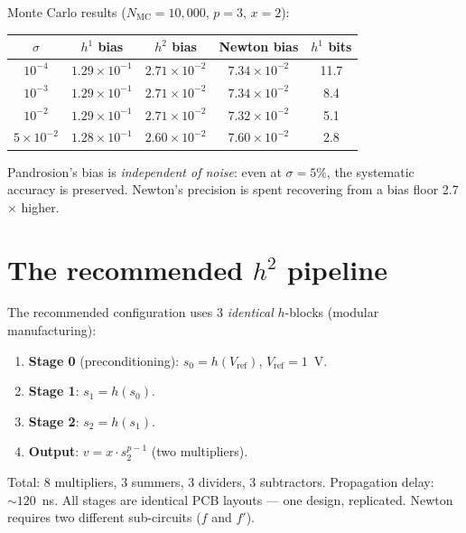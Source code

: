 \documentclass[10pt,a4paper,oneside]{book}
\theoremstyle{definition}
\theoremstyle{remark}
\begin{document}
Monte Carlo results ($N_{\mathrm{MC}} = 10{,}000$, $p = 3$, $x = 2$):

\begin{center}
\renewcommand{\arraystretch}{1.2}
\begin{tabular}{ccccc}
\toprule
$\sigma$ & $h^1$ bias & $h^2$ bias & Newton bias & $h^1$ bits \\
\midrule
$10^{-4}$ & $1.29 \times 10^{-1}$ & $2.71 \times 10^{-2}$ & $7.34 \times 10^{-2}$ & 11.7 \\
$10^{-3}$ & $1.29 \times 10^{-1}$ & $2.71 \times 10^{-2}$ & $7.34 \times 10^{-2}$ & 8.4 \\
$10^{-2}$ & $1.29 \times 10^{-1}$ & $2.71 \times 10^{-2}$ & $7.32 \times 10^{-2}$ & 5.1 \\
$5 \times 10^{-2}$ & $1.28 \times 10^{-1}$ & $2.60 \times 10^{-2}$ & $7.60 \times 10^{-2}$ & 2.8 \\
\bottomrule
\end{tabular}
\end{center}

Pandrosion's bias is \emph{independent of noise}: even at $\sigma = 5\%$, the systematic accuracy is preserved.  Newton's precision is spent recovering from a bias floor 2.7$\times$ higher.

\section{The recommended $h^2$ pipeline}

The recommended configuration uses 3 \emph{identical} $h$-blocks (modular manufacturing):

\begin{enumerate}[nosep]
\item \textbf{Stage 0} (preconditioning): $s_0 = h(V_{\mathrm{ref}})$, $V_{\mathrm{ref}} = 1$~V.
\item \textbf{Stage 1}: $s_1 = h(s_0)$.
\item \textbf{Stage 2}: $s_2 = h(s_1)$.
\item \textbf{Output}: $v = x \cdot s_2^{p-1}$ (two multipliers).
\end{enumerate}

Total: 8 multipliers, 3 summers, 3 dividers, 3 subtractors.  Propagation delay: $\sim 120$~ns.  All stages are identical PCB layouts --- one design, replicated.  Newton requires two different sub-circuits ($f$ and $f'$).
\end{document}

